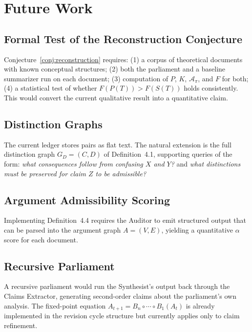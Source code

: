 \documentclass[12pt, a4paper]{article}
\theoremstyle{principle}
\theoremstyle{definition}
\begin{document}
\section{Future Work}
\label{sec:future}

\subsection{Formal Test of the Reconstruction Conjecture}

Conjecture~\ref{conj:reconstruction} requires: (1) a corpus of theoretical
documents with known conceptual structures; (2) both the parliament and a baseline
summarizer run on each document; (3) computation of $P$, $K$, $\mathcal{A}_\pi$,
and $F$ for both; (4) a statistical test of whether $F(P(T)) > F(S(T))$ holds
consistently. This would convert the current qualitative result into a
quantitative claim.

\subsection{Distinction Graphs}

The current ledger stores pairs as flat text. The natural extension is the full
distinction graph $G_D = (C, D)$ of Definition~4.1, supporting queries of the
form: \emph{what consequences follow from confusing $X$ and $Y$?} and \emph{what
distinctions must be preserved for claim $Z$ to be admissible?}

\subsection{Argument Admissibility Scoring}

Implementing Definition~4.4 requires the Auditor to emit structured output that
can be parsed into the argument graph $A = (V, E)$, yielding a quantitative
$\alpha$ score for each document.

\subsection{Recursive Parliament}

A recursive parliament would run the Synthesist's output back through the Claims
Extractor, generating second-order claims about the parliament's own analysis.
The fixed-point equation $A_{t+1} = B_n \circ \cdots \circ B_1(A_t)$ is already
implemented in the revision cycle structure but currently applies only to claim
refinement.
\end{document}
